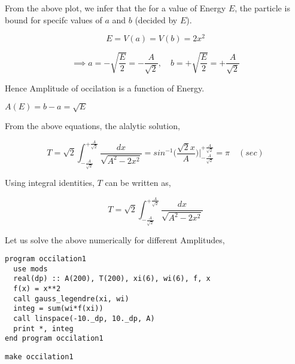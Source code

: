 \documentclass[a4paper,11pt,twoside]{article}
\begin{document}
\begin{center}
\end{center}

From the above plot, we infer that the for a value of Energy \(E\), the particle is bound for specifc values of \(a\) and \(b\) (decided by \(E\)).

$$
E = V(a)=V(b) = 2x^2
$$

$$
 \implies a = -\sqrt{\frac{E}{2}} = -\frac{A}{\sqrt{2}}, \quad b = +\sqrt{\frac{E}{2}} = +\frac{A}{\sqrt{2}}
$$

Hence Amplitude of occilation is a function of Energy.

\begin{center}
\(A(E) = b-a = \sqrt{E}\)
\end{center}

\clearpage

From the above equations, the alalytic solution,


$$
T = \sqrt{2}\int_{-\frac{A}{\sqrt{2}}}^{+\frac{A}{\sqrt{2}}} \frac{dx}{\sqrt{A^2-2x^2}} = sin^{-1}{\Big(\frac{\sqrt{2}x}{A}\Big)} \Big|_{-\frac{A}{\sqrt{2}}}^{+\frac{A}{\sqrt{2}}} = \pi \quad (sec)
$$

Using integral identities,  \(T\) can be written as,

$$
T = \sqrt{2}\int_{-\frac{A}{\sqrt{2}}}^{+\frac{A}{\sqrt{2}}} \frac{dx}{\sqrt{A^2-2x^2}}
$$

Let us solve the above numerically for different Amplitudes,

\begin{verbatim}
program occilation1
  use mods
  real(dp) :: A(200), T(200), xi(6), wi(6), f, x
  f(x) = x**2
  call gauss_legendre(xi, wi)
  integ = sum(wi*f(xi))
  call linspace(-10._dp, 10._dp, A)
  print *, integ
end program occilation1
\end{verbatim}

\begin{verbatim}
make occilation1
\end{verbatim}
\end{document}
